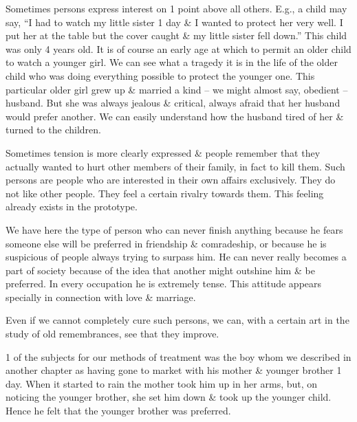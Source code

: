 \documentclass{article}
\begin{document}
Sometimes persons express interest on 1 point above all others. E.g., a child may say, ``I had to watch my little sister 1 day \& I wanted to protect her very well. I put her at the table but the cover caught \& my little sister fell down.'' This child was only 4 years old. It is of course an early age at which to permit an older child to watch a younger girl. We can see what a tragedy it is in the life of the older child who was doing everything possible to protect the younger one. This particular older girl grew up \& married a kind -- we might almost say, obedient -- husband. But she was always jealous \& critical, always afraid that her husband would prefer another. We can easily understand how the husband tired of her \& turned to the children.

Sometimes tension is more clearly expressed \& people remember that they actually wanted to hurt other members of their family, in fact to kill them. Such persons are people who are interested in their own affairs exclusively. They do not like other people. They feel a certain rivalry towards them. This feeling already exists in the prototype.

We have here the type of person who can never finish anything because he fears someone else will be preferred in friendship \& comradeship, or because he is suspicious of people always trying to surpass him. He can never really becomes a part of society because of the idea that another might outshine him \& be preferred. In every occupation he is extremely tense. This attitude appears specially in connection with love \& marriage.

Even if we cannot completely cure such persons, we can, with a certain art in the study of old remembrances, see that they improve.

1 of the subjects for our methods of treatment was the boy whom we described in another chapter as having gone to market with his mother \& younger brother 1 day. When it started to rain the mother took him up in her arms, but, on noticing the younger brother, she set him down \& took up the younger child. Hence he felt that the younger brother was preferred.
\end{document}
